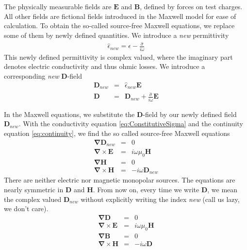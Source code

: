\documentclass[12pt,a4paper,twoside,openright,BCOR10mm,headsepline,titlepage,abstracton,chapterprefix,final]{scrreprt}
\newcommand\Vector[1]{{\mathbf{#1}}}
\newcommand\vacuum{0}
\newcommand\Nabla{\Vector{\nabla}}
\newcommand\Tensor[1]{\hat{#1}}
\newcommand\scalarEfield{E}
\newcommand\scalarBfield{B}
\newcommand\scalarHfield{H}
\newcommand\scalarDfield{D}
\newcommand\Efield{\Vector{\scalarEfield}}
\newcommand\Bfield{\Vector{\scalarBfield}}
\newcommand\Hfield{\Vector{\scalarHfield}}
\newcommand\Dfield{\Vector{\scalarDfield}}
\newcommand\vacuumpermeability{\mu_{\vacuum}}
\newcommand\permittivity{\Tensor{\epsilon}}
\newcommand\conductivity{\Tensor{\sigma}}
\begin{document}
The physically measurable fields are $\Efield$ and $\Bfield$, defined by forces on test charges. All other fields are fictional fields introduced in the Maxwell model for ease of calculation.
To obtain the so-called source-free Maxwell equations, we replace some of them by newly defined quantities.
We introduce a \emph{new} permittivity
\begin{eqnarray}
  \permittivity_{new} = \permittivity - \frac{\conductivity}{i \omega}
\end{eqnarray}
This newly defined permittivity is complex valued, where the imaginary part denotes electric conductivity and thus ohmic losses.
We introduce a corresponding \emph{new} $\Dfield$-field
\begin{eqnarray}
  \Dfield_{new} &=& \permittivity_{new} \Efield \\
  \Dfield &=& \Dfield_{new} + \frac{\conductivity}{i \omega} \Efield
\end{eqnarray}

In the Maxwell equations, we substitute the $\Dfield$-field by our newly defined field $\Dfield_{new}$.
With the conductivity equation \ref{eq:ConstitutiveSigma} and the continuity equation \ref{eq:continuity}, we find the so called source-free Maxwell equations
\begin{subequations}
\begin{eqnarray}
  \Nabla \Dfield_{new} &=& 0 					\label{eq:divDsourcefree}\\
  \Nabla \times \Efield &=& i \omega \vacuumpermeability \Hfield	\\
  \Nabla \Hfield &=& 0  					\\
  \Nabla \times \Hfield &=& - i \omega \Dfield_{new}  		
\end{eqnarray}
\end{subequations}
There are neither electric nor magnetic monopolar sources.
The equations are nearly symmetric in $\Dfield$ and $\Hfield$.
From now on, every time we write $\Dfield$, we mean the complex valued $\Dfield_{new}$ without explicitly writing the index \emph{new} (call us lazy, we don't care).
\begin{subequations}
\begin{eqnarray}
  \Nabla \Dfield &=& 0 					 	 \label{eq:sourcefreemaxwell_divD} \\
  \Nabla \times \Efield &=& i \omega \vacuumpermeability \Hfield \label{eq:sourcefreemaxwell_rotE}	\\
  \Nabla \Bfield &=& 0  					 \label{eq:sourcefreemaxwell_divB} \\
  \Nabla \times \Hfield &=& - i \omega \Dfield  		 \label{eq:sourcefreemaxwell_rotH}
\end{eqnarray}
\label{eq:sourcefreemaxwell}
\end{subequations}
\end{document}
